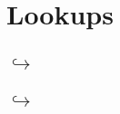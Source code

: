 
\section{Lookups}
\subsection{\rlpTxnMod{} $\hookrightarrow$ \romMod{} \lispDone{}}    \label{hub: lookups: into the rom}     
\subsection{\rlpTxnMod{} $\hookrightarrow$ \hubMod{} \lispDone{}}    \label{hub: lookups: into the hub}     

